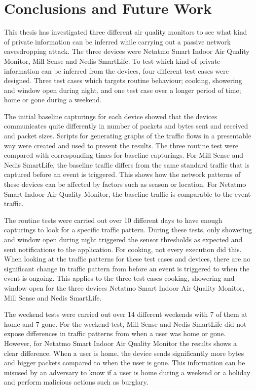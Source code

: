 \chapter{Conclusions and Future Work}
This thesis has investigated three different air quality monitors to see what kind of private information can be inferred while carrying out a passive network eavesdropping attack. The three devices were Netatmo Smart Indoor Air Quality Monitor, Mill Sense and Nedis SmartLife. To test which kind of private information can be inferred from the devices, four different test cases were designed. Three test cases which targets routine behaviour; cooking, showering and window open during night, and one test case over a longer period of time; home or gone during a weekend. 

The initial baseline capturings for each device showed that the devices communicates quite differently in number of packets and bytes sent and received and packet sizes. Scripts for generating graphs of the traffic flows in a presentable way were created and used to present the results. The three routine test were compared with corresponding times for baseline capturings. For Mill Sense and Nedis SmartLife, the baseline traffic differs from the same standard traffic that is captured before an event is triggered. This shows how the network patterns of these devices can be affected by factors such as season or location. For Netatmo Smart Indoor Air Quality Monitor, the baseline traffic is comparable to the event traffic. 

The routine tests were carried out over 10 different days to have enough capturings to look for a specific traffic pattern. During these tests, only showering and window open during night triggered the sensor thresholds as expected and sent notifications to the application. For cooking, not every execution did this. When looking at the traffic patterns for these test cases and devices, there are no significant change in traffic pattern from before an event is triggered to when the event is ongoing. This applies to the three test cases cooking, showering and window open for the three devices Netatmo Smart Indoor Air Quality Monitor, Mill Sense and Nedis SmartLife.  

The weekend tests were carried out over 14 different weekends with 7 of them at home and 7 gone. For the weekend test, Mill Sense and Nedis SmartLife did not expose differences in traffic patterns from when a user was home or gone. However, for Netatmo Smart Indoor Air Quality Monitor the results shows a clear difference. When a user is home, the device sends significantly more bytes and bigger packets compared to when the user is gone. This information can be misused by an adversary to know if a user is home during a weekend or a holiday and perform malicious actions such as burglary. 

